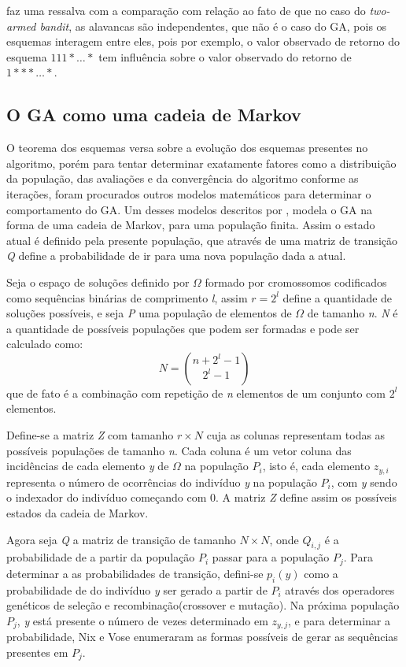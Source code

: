 \citeauthor{Mitchell1996} faz uma ressalva com a comparação com relação ao fato de que no caso do \textit{two-armed bandit}, as alavancas são independentes, que não é o caso do GA, pois os esquemas interagem entre eles, pois por exemplo, o valor observado de retorno do esquema \(111*\ldots*\) tem influência sobre o valor observado do retorno de \(1***\ldots*\).

\subsection{O GA como uma cadeia de Markov}
O teorema dos esquemas versa sobre a evolução dos esquemas presentes no algoritmo, porém para tentar determinar exatamente fatores como a distribuição da população, das avaliações e da convergência do algoritmo conforme as iterações, foram procurados outros modelos matemáticos para determinar o comportamento do GA. Um desses modelos descritos por \citeauthor{Nix1992}, modela o GA na forma de uma cadeia de Markov, para uma população finita. Assim o estado atual é definido pela presente população, que através de uma matriz de transição \textit{Q} define a probabilidade de ir para uma nova população dada a atual.

Seja o espaço de soluções definido por \(\Omega\) formado por cromossomos codificados como sequências binárias de comprimento \textit{l}, assim \(r=2^l\) define a quantidade de soluções possíveis, e seja \textit{P} uma população de elementos de \(\Omega\) de tamanho \textit{n}. \textit{N} é a quantidade de possíveis populações que podem ser formadas e pode ser calculado como:
\[N = \binom{n+2^l-1}{2^l-1}\]
que de fato é a combinação com repetição de \textit{n} elementos de um conjunto com \(2^l\) elementos.

Define-se a matriz \textit{Z} com tamanho \(r\times N\) cuja as colunas representam todas as possíveis populações de tamanho \textit{n}. Cada coluna é um vetor coluna das incidências de cada elemento \textit{y} de \(\Omega\) na população \(P_i\), isto é,  cada elemento \(z_{y,i}\) representa o número de ocorrências do indivíduo \textit{y} na população \(P_i\), com \textit{y} sendo o indexador do indivíduo começando com 0. A matriz \textit{Z} define assim os possíveis estados da cadeia de Markov.

Agora seja \textit{Q} a matriz de transição de tamanho \(N \times N\), onde \(Q_{i,j}\) é a probabilidade de a partir da população \(P_i\) passar para a população \(P_j\). Para determinar a as probabilidades de transição, defini-se \(p_i(y)\) como a probabilidade de do indivíduo \textit{y} ser gerado a partir de \(P_i\) através dos operadores genéticos de seleção e recombinação(crossover e mutação). Na próxima população \(P_j\), \textit{y} está presente o número de vezes determinado em \(z_{y,j}\), e para determinar a probabilidade, Nix e Vose enumeraram as formas possíveis de gerar as sequências presentes em \(P_j\).

